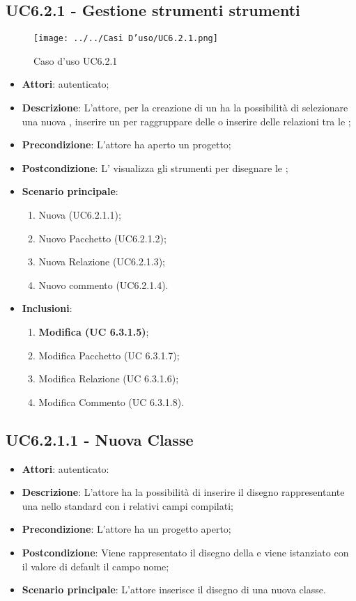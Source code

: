 \subsection{UC6.2.1 - Gestione strumenti strumenti }
\label{ssec:UC6.2.1}
\begin{figure}[h!]
\centering
\texttt{[image: ../../Casi D'uso/UC6.2.1.png]}
\caption{Caso d'uso UC6.2.1}
 \end{figure}
\begin{itemize}
\item \textbf{Attori}:  autenticato;
\item \textbf{Descrizione}: L'attore, per la creazione di un  ha la possibilità di selezionare una nuova , inserire un  per raggruppare delle  o inserire delle relazioni tra le ;
\item \textbf{Precondizione}: L'attore ha aperto un progetto;
\item \textbf{Postcondizione}: L' visualizza gli strumenti per disegnare le ;
\item \textbf{Scenario principale}: \begin{enumerate}\item Nuova  (UC6.2.1.1);\item Nuovo Pacchetto (UC6.2.1.2);\item Nuova Relazione (UC6.2.1.3);\item Nuovo commento (UC6.2.1.4).
 \end{enumerate}
 \item \textbf{Inclusioni}: \begin{enumerate}
 	\item \textbf{ Modifica  (UC 6.3.1.5)};
 	\item Modifica Pacchetto (UC 6.3.1.7);
 	\item Modifica Relazione (UC 6.3.1.6);
 	\item Modifica Commento (UC 6.3.1.8).
 \end{enumerate}
\end{itemize}
\subsection{UC6.2.1.1 - Nuova Classe}
\label{ssec:UC6.2.1.1}
\begin{itemize}
\item \textbf{Attori}:  autenticato:
\item \textbf{Descrizione}: L'attore ha la possibilità di inserire il disegno rappresentante una  nello standard  con i relativi campi compilati;
\item \textbf{Precondizione}: L'attore ha un progetto aperto;
\item \textbf{Postcondizione}: Viene rappresentato il disegno della  e viene istanziato con il valore di default il campo nome;
\item \textbf{Scenario principale}: L'attore inserisce il disegno di una nuova classe.
\end{itemize}
